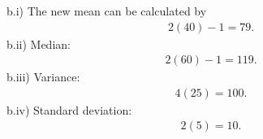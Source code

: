 \documentclass{report}
\begin{document}
    \bigbreak \noindent 
    b.i) The new mean can be calculated by
    \begin{align*}
        2(40)-1 = 79
    .\end{align*}
    \bigbreak \noindent 
    b.ii) Median:
    \begin{align*}
       2(60)-1 = 119 
    .\end{align*}
    \bigbreak \noindent 
    b.iii) Variance:
    \begin{align*}
        4(25) = 100
    .\end{align*}
    \bigbreak \noindent 
    b.iv) Standard deviation:
    \begin{align*}
        2(5) = 10
    .\end{align*}


 
\end{document}
